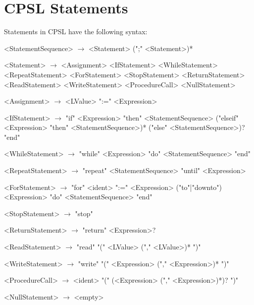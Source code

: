 \documentclass{book}
\begin{document}
\section{CPSL Statements}
Statements in CPSL have the following syntax:
\begin{grammar}
<StatementSequence> $\rightarrow$ <Statement> (";" <Statement>)*

<Statement> $\rightarrow$ <Assignment>
\alt <IfStatement>
\alt <WhileStatement>
\alt <RepeatStatement>
\alt <ForStatement>
\alt <StopStatement>
\alt <ReturnStatement>
\alt <ReadStatement>
\alt <WriteStatement>
\alt <ProcedureCall>
\alt <NullStatement>

<Assignment> $\rightarrow$ <LValue> ":=" <Expression>

<IfStatement> $\rightarrow$ "if" <Expression> "then" <StatementSequence> ("elseif" <Expression> "then" <StatementSequence>)* ("else" <StatementSequence>)? "end"

<WhileStatement> $\rightarrow$ "while" <Expression> "do" <StatementSequence> "end"

<RepeatStatement> $\rightarrow$ "repeat" <StatementSequence> "until" <Expression>

<ForStatement> $\rightarrow$ "for" <ident> ":=" <Expression> ("to"|"downto") <Expression> "do" <StatementSequence> "end"

<StopStatement> $\rightarrow$ "stop"

<ReturnStatement> $\rightarrow$ "return" <Expression>?

<ReadStatement> $\rightarrow$ "read" "(" <LValue> ("," <LValue>)* ")"

<WriteStatement> $\rightarrow$ "write" "(" <Expression> ("," <Expression>)* ")"

<ProcedureCall> $\rightarrow$ <ident> "(" (<Expression> ("," <Expression>)*)? ")"

<NullStatement> $\rightarrow$ <empty>
\end{grammar}
\end{document}
